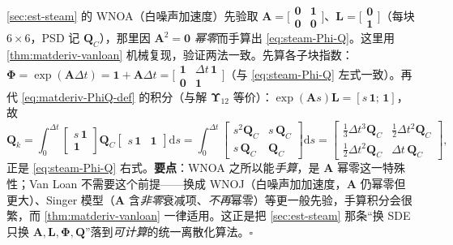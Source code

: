 \begin{derivation}
\cref{sec:est-steam} 的 WNOA（白噪声加速度）先验取 $\mathbf{A}=\big[\begin{smallmatrix}\mathbf{0}&\mathbf{1}\\\mathbf{0}&\mathbf{0}\end{smallmatrix}\big]$、$\mathbf{L}=\big[\begin{smallmatrix}\mathbf{0}\\\mathbf{1}\end{smallmatrix}\big]$（每块 $6\times6$，PSD 记 $\mathbf{Q}_C$），那里因 $\mathbf{A}^2=\mathbf{0}$ \emph{幂零}而手算出 \cref{eq:steam-Phi-Q}。这里用 \cref{thm:matderiv-vanloan} 机械复现，验证两法一致。先算各子块指数：$\boldsymbol{\Phi}=\exp(\mathbf{A}\Delta t)=\mathbf{1}+\mathbf{A}\Delta t=\big[\begin{smallmatrix}\mathbf{1}&\Delta t\,\mathbf{1}\\\mathbf{0}&\mathbf{1}\end{smallmatrix}\big]$（与 \cref{eq:steam-Phi-Q} 左式一致）。再代 \cref{eq:matderiv-PhiQ-def} 的积分（与解 $\boldsymbol{\Upsilon}_{12}$ 等价）：$\exp(\mathbf{A}s)\mathbf{L}=[s\,\mathbf{1};\,\mathbf{1}]$，故
\[
  \mathbf{Q}_k=\int_0^{\Delta t}\begin{bmatrix}s\,\mathbf{1}\\\mathbf{1}\end{bmatrix}\mathbf{Q}_C\begin{bmatrix}s\,\mathbf{1}&\mathbf{1}\end{bmatrix}\mathrm{d}s
  =\int_0^{\Delta t}\begin{bmatrix}s^2\mathbf{Q}_C&s\,\mathbf{Q}_C\\s\,\mathbf{Q}_C&\mathbf{Q}_C\end{bmatrix}\mathrm{d}s
  =\begin{bmatrix}\tfrac13\Delta t^3\mathbf{Q}_C&\tfrac12\Delta t^2\mathbf{Q}_C\\[2pt]\tfrac12\Delta t^2\mathbf{Q}_C&\Delta t\,\mathbf{Q}_C\end{bmatrix},
\]
正是 \cref{eq:steam-Phi-Q} 右式。\textbf{要点}：WNOA 之所以能\emph{手算}，是 $\mathbf{A}$ 幂零这一特殊性；Van Loan 不需要这个前提——换成 WNOJ（白噪声加加速度，$\mathbf{A}$ 仍幂零但更大）、Singer 模型（$\mathbf{A}$ 含\emph{非零}衰减项、\emph{不再}幂零）等更一般先验，手算积分会很繁，而 \cref{thm:matderiv-vanloan} 一律适用。这正是把 \cref{sec:est-steam} 那条“换 SDE 只换 $\mathbf{A},\mathbf{L},\boldsymbol{\Phi},\mathbf{Q}$”落到\emph{可计算}的统一离散化算法。\hfill$\square$
\end{derivation}


